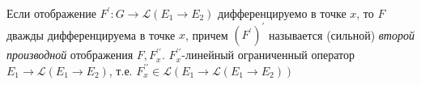 \begin{definition}
    Если отображение $F^\prime\colon G \to \mathcal{L} (E_1 \to E_2)$ дифференцируемо в точке $x$, то $F$ дважды дифференцируема в точке  $x$, причем $(F^\prime)^\prime$ называется (сильной) \textit{второй производной} отображения $F, F^{\prime\prime}_x$. $F^{\prime\prime}_x$-линейный ограниченный оператор $E_1 \to \mathcal{L} (E_1 \to E_2)$, т.е. $F^{\prime\prime}_x \in \mathcal{L}(E_1 \to \mathcal{L} (E_1 \to E_2))$
\end{definition}


